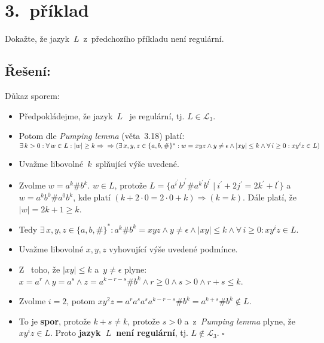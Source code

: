 \documentclass[a4paper, 11pt]{scrartcl}
\newcommand*{\QEDB}{\hfill\ensuremath{\square}}
\begin{document}
    \section*{3.~příklad}

    Dokažte, že jazyk~$ L $~z~předchozího příkladu není regulární.

    \subsection*{Řešení:}

    Důkaz sporem:
    \begin{itemize}
        \item
            Předpokládejme, že jazyk~$ L $~ je regulární, tj. $ L \in
            \mathcal{L}_3$.

        \item
            Potom dle \emph{Pumping lemma} (věta~3.18) platí: \\
            $ \exists\,k > 0: \forall\,w \in L: |w| \geq k \Rightarrow \\
            \Rightarrow (\exists\,x, y, z \in \{a, b, \#\}^*: w = xyz \wedge y
            \neq \epsilon \wedge |xy| \leq k \wedge \forall\,i \geq 0: xy^iz \in
            L ) $

        \item
            Uvažme libovolné~$ k $~splňující výše uvedené.

        \item
            Zvolme $ w = a^k\#b^k $. $ w \in L $, protože $ L = \{a^{i^\prime}%
            b^{j^\prime}\#a^{k^\prime}b^{l^\prime}\ |\ i^\prime + 2j^\prime =
            2k^\prime + l^\prime\} $ a~$ w = a^kb^0\#a^0b^k $, kde platí
            $ (k + 2 \cdot 0 = 2 \cdot 0 + k) \Rightarrow (k = k) $. Dále
            platí, že $ |w| = 2k + 1 \geq k $.

        \item
            Tedy $ \exists\,x, y, z \in \{a, b, \#\}^*: a^k\#b^k = xyz \wedge
            y \neq \epsilon \wedge |xy| \leq k \wedge \forall\,i \geq 0:
            xy^iz \in L $.

        \item
            Uvažme libovolné $ x, y, z $ vyhovující výše uvedené podmínce.

        \item
            Z~ toho, že $ |xy| \leq k $ a~$ y \neq \epsilon $ plyne:
            $ x = a^r \wedge y = a^s \wedge z = a^{k-r-s}\#b^k \wedge
            r \geq 0 \wedge s > 0 \wedge r + s \leq k$.

        \item
            Zvolme $ i = 2 $, potom $ xy^2z = a^ra^sa^sa^{k-r-s}\#b^k =
            a^{k+s}\#b^k \notin L $.

        \item
            To je \textbf{spor}, protože $ k + s \neq k $, protože $ s > 0 $
            a~z~\emph{Pumping lemma} plyne, že $ xy^iz \in L $. Proto
            \textbf{jazyk~$ L $~není regulární}, tj. $ L \notin \mathcal{L}_3 $.
            \QEDB
    \end{itemize}
\end{document}

